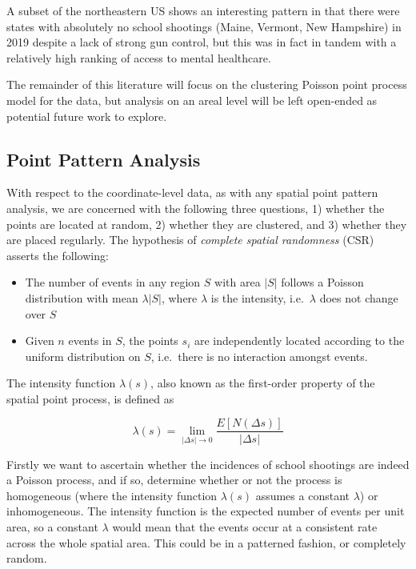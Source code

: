 \documentclass[12pt]{article}
\providecommand{\tightlist}{%
  \setlength{\itemsep}{0pt}\setlength{\parskip}{0pt}}
\begin{document}
A subset of the northeastern US shows an interesting pattern in that there were states with absolutely no school shootings (Maine, Vermont, New Hampshire) in 2019 despite a lack of strong gun control, but this was in fact in tandem with a relatively high ranking of access to mental healthcare.

The remainder of this literature will focus on the clustering Poisson point process model for the data, but analysis on an areal level will be left open-ended as potential future work to explore.

\hypertarget{point-pattern-analysis}{%
\subsection{Point Pattern Analysis}\label{point-pattern-analysis}}

With respect to the coordinate-level data, as with any spatial point pattern analysis, we are concerned with the following three questions, 1) whether the points are located at random, 2) whether they are clustered, and 3) whether they are placed regularly. The hypothesis of \emph{complete spatial randomness} (CSR) asserts the following:

\begin{itemize}
\tightlist
\item
  The number of events in any region \(S\) with area \(|S|\) follows a Poisson distribution with mean \(\lambda |S|\), where \(\lambda\) is the intensity, i.e.~\(\lambda\) does not change over \(S\)
\item
  Given \(n\) events in \(S\), the points \(s_i\) are independently located according to the uniform distribution on \(S\), i.e.~there is no interaction amongst events.
\end{itemize}

The intensity function \(\lambda(s)\), also known as the first-order property of the spatial point process, is defined as

\[\lambda(s) = \lim_{|\Delta s| \to 0} \frac{E[N(\Delta s)]}{| \Delta s|}\]

Firstly we want to ascertain whether the incidences of school shootings are indeed a Poisson process, and if so, determine whether or not the process is homogeneous (where the intensity function \(\lambda(s)\) assumes a constant \(\lambda\)) or inhomogeneous. The intensity function is the expected number of events per unit area, so a constant \(\lambda\) would mean that the events occur at a consistent rate across the whole spatial area. This could be in a patterned fashion, or completely random.
\end{document}
